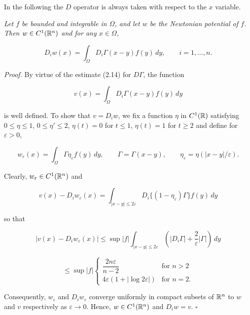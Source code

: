 \medskip

\noindent In the following the $D$ operator is always taken with respect to the $x$ variable.

\medskip

\begin{lemma}\label{gt:lem-newtonian-c1}
\textit{Let $f$ be bounded and integrable in $\Omega$, and let $w$ be the Newtonian potential of $f$. Then $w \in C^1(\mathbb{R}^n)$ and for any $x \in \Omega$,}

\begin{equation}
\tag{4.8}
D_i w(x)=\int_{\Omega} D_i \Gamma(x-y) f(y)\,dy, \qquad i=1,\ldots,n.
\end{equation}

\noindent \textit{Proof.} By virtue of the estimate (2.14) for $D\Gamma$, the function

\begin{equation*}
v(x)=\int_{\Omega} D_i \Gamma(x-y) f(y)\,dy
\end{equation*}

\noindent is well defined. To show that $v=D_i w$, we fix a function $\eta$ in $C^1(\mathbb{R})$ satisfying $0 \le \eta \le 1$, $0 \le \eta' \le 2$, $\eta(t)=0$ for $t \le 1$, $\eta(t)=1$ for $t \ge 2$ and define for $\varepsilon>0$,

\begin{equation*}
w_{\varepsilon}(x)=\int_{\Omega}\Gamma \eta_{\varepsilon} f(y)\,dy,\qquad \Gamma=\Gamma(x-y),\qquad \eta_{\varepsilon}=\eta(|x-y|/\varepsilon).
\end{equation*}

\noindent Clearly, $w_{\varepsilon} \in C^1(\mathbb{R}^n)$ and

\begin{equation*}
v(x)-D_i w_{\varepsilon}(x)=\int_{|x-y|\le 2\varepsilon} D_i\{(1-\eta_{\varepsilon})\Gamma\}f(y)\,dy
\end{equation*}

\noindent so that

\begin{equation*}
|v(x)-D_i w_{\varepsilon}(x)|\le \sup |f| \int_{|x-y|\le 2\varepsilon}\left(|D_i\Gamma|+\frac{2}{\varepsilon}|\Gamma|\right)\,dy
\end{equation*}

\begin{equation*}
\le \sup |f|\begin{cases}
\dfrac{2n\varepsilon}{n-2} & \text{for } n>2\\[0.8ex]
4\varepsilon(1+|\log 2\varepsilon|) & \text{for } n=2.
\end{cases}
\end{equation*}

\noindent Consequently, $w_{\varepsilon}$ and $D_i w_{\varepsilon}$ converge uniformly in compact subsets of $\mathbb{R}^n$ to $w$ and $v$ respectively as $\varepsilon\to 0$. Hence, $w \in C^1(\mathbb{R}^n)$ and $D_i w = v$. \hfill $\square$
\end{lemma}

